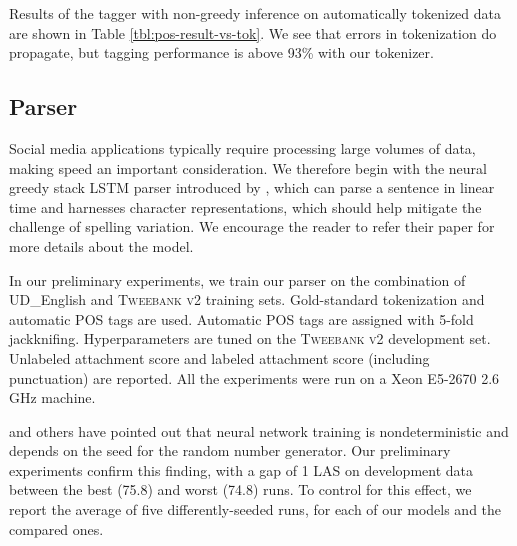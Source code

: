 \documentclass[11pt,a4paper]{article}
\begin{document}
Results of the \citet{owoputi-EtAl:2013:NAACL-HLT}  tagger with non-greedy
inference on automatically tokenized data
are shown in  Table \ref{tbl:pos-result-vs-tok}.  We see that errors
in tokenization do propagate, but tagging performance is above 93\%
with our tokenizer. 

\subsection{Parser}

Social media applications typically require processing large volumes
of data, making speed an important consideration. We therefore 
begin with the neural greedy stack LSTM parser introduced by ,
which can parse a sentence in linear time and harnesses 
character representations, which should help mitigate the challenge of
spelling variation. We encourage the reader to refer their paper for
more details about the model.

In our preliminary experiments, we train our parser on the combination of UD\_English
and \textsc{Tweebank v2} training sets. Gold-standard tokenization and automatic POS
tags are used. Automatic POS tags are assigned with 5-fold
jackknifing. Hyperparameters %
are tuned on the \textsc{Tweebank v2} development set. Unlabeled attachment score and
labeled attachment score (including punctuation) are reported.
All the experiments were run on a Xeon E5-2670 2.6 GHz machine.

\citet{reimers-gurevych:2017:EMNLP2017} and others have
pointed out that neural network training is 
nondeterministic and depends on the seed for the random
number generator.
Our preliminary experiments confirm this finding, with a gap of 1 LAS on development data
between the best (75.8) and worst (74.8) runs. To control for this
effect, we report the average of five differently-seeded runs, for
each of our models and the compared ones.
\end{document}
